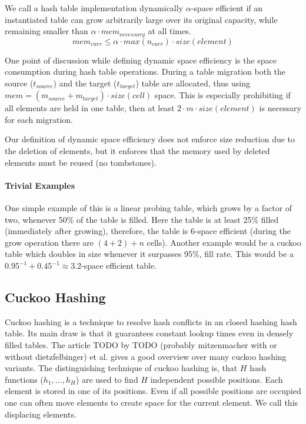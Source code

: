 \documentclass[a4paper,UKenglish]{lipics-v2016}
\begin{document}
We call a hash table implementation dynamically \(\alpha\)-space
efficient if an instantiated table can grow arbitrarily large over its
original capacity, while remaining smaller than \(\alpha\cdot
mem_{necessary}\) at all times.  \[mem_{curr} \leq \alpha\cdot
max(n_{curr})\cdot size(element)\]

One point of discussion while defining dynamic space efficiency is the
space consumption during hash table operations.  During a table
migration both the source (\(t_{source}\)) and the target
(\(t_{target}\)) table are allocated, thus using \(mem =
(m_{source}+m_{target})\cdot size(cell)\) space.  This is especially
prohibiting if all elements are held in one table, then at least
\(2\cdot m\cdot size(element)\) is necessary for each migration.

Our definition of dynamic space efficiency does not enforce size
reduction due to the deletion of elements, but it enforces that the
memory used by deleted elements must be reused (no tombstones).

\paragraph{Trivial Examples}
One simple example of this is a linear probing table, which grows by a
factor of two, whenever 50\% of the table is filled. Here the table is
at least 25\% filled (immediately after growing), therefore, the table
is 6-space efficient (during the grow operation there are \((4+2)+n\)
cells). Another example would be a cuckoo table which doubles in size
whenever it surpasses 95\%, fill rate. This would be a
$0.95^{-1}+0.45^{-1}\approx 3.2$-space efficient table.

\subsection{Cuckoo Hashing}
Cuckoo hashing is a technique to resolve hash conflicts in an closed hashing hash table. Its main draw is that it guarantees constant
lookup times even in densely filled tables. The article TODO by TODO
(probably mitzenmacher with or without dietzfelbinger) et al. gives a
good overview over many cuckoo hashing variants.  The distinguishing
technique of cuckoo hashing is, that $H$ hash functions (\(h_1, ... ,
h_H\)) are used to find $H$ independent possible positions. Each
element is stored in one of its positions.  Even if all possible
positions are occupied one can often move elements to create space for the
current element. We call this displacing elements.
\end{document}
